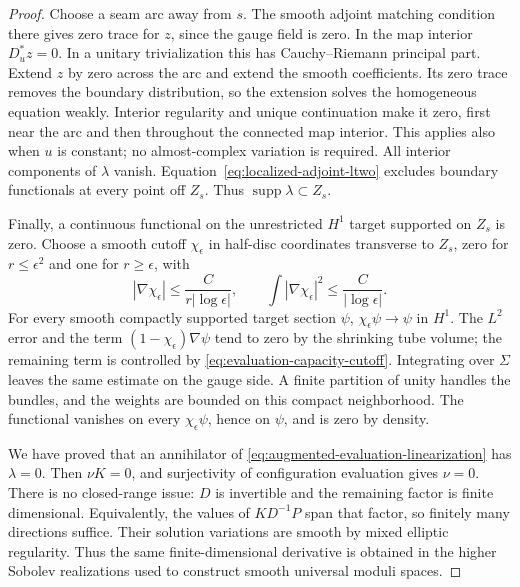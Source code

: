 \documentclass[11pt]{amsart}
\theoremstyle{definition}
\theoremstyle{remark}
\theoremstyle{plain}
\begin{document}
\begin{proof}
Choose a seam arc away from $s$. The smooth adjoint matching
condition there gives zero trace for $z$, since the gauge field
is zero. In the map interior $D_u^*z=0$. In a unitary
trivialization this has Cauchy--Riemann principal part. Extend
$z$ by zero across the arc and extend the smooth coefficients.
Its zero trace removes the boundary distribution, so the
extension solves the homogeneous equation weakly. Interior
regularity and unique continuation make it zero, first near the
arc and then throughout the connected map interior. This applies
also when $u$ is constant; no almost-complex variation is required.
All interior components of $\lambda$ vanish.
Equation~\eqref{eq:localized-adjoint-ltwo} excludes boundary
functionals at every point off $Z_s$. Thus
$\operatorname{supp}\lambda\subset Z_s$.

Finally, a continuous functional on the unrestricted $H^1$ target
supported on $Z_s$ is zero. Choose a smooth cutoff
$\chi_\epsilon$ in half-disc coordinates transverse to $Z_s$,
zero for $r\leq\epsilon^2$ and one for $r\geq\epsilon$, with
\begin{equation}\label{eq:evaluation-capacity-cutoff}
 |\nabla\chi_\epsilon|\leq
       \frac{C}{r|\log\epsilon|},\qquad
 \int|\nabla\chi_\epsilon|^2\leq
       \frac{C}{|\log\epsilon|}.
\end{equation}
For every smooth compactly supported target section $\psi$,
$\chi_\epsilon\psi\to\psi$ in $H^1$. The $L^2$ error and
the term $(1-\chi_\epsilon)\nabla\psi$ tend to zero by the
shrinking tube volume; the remaining term is controlled by
\eqref{eq:evaluation-capacity-cutoff}. Integrating over $\Sigma$
leaves the same estimate on the gauge side. A finite partition
of unity handles the bundles, and the weights are bounded on
this compact neighborhood. The functional vanishes on every
$\chi_\epsilon\psi$, hence on $\psi$, and is zero by density.

We have proved that an annihilator of
\eqref{eq:augmented-evaluation-linearization} has $\lambda=0$.
Then $\nu K=0$, and surjectivity of configuration evaluation
gives $\nu=0$. There is no closed-range issue: $D$ is invertible
and the remaining factor is finite dimensional. Equivalently,
the values of $KD^{-1}P$ span that factor, so finitely many
directions suffice. Their solution variations are smooth by mixed
elliptic regularity. Thus the same finite-dimensional derivative
is obtained in the higher Sobolev realizations used to construct
smooth universal moduli spaces.


\end{proof}
\end{document}
